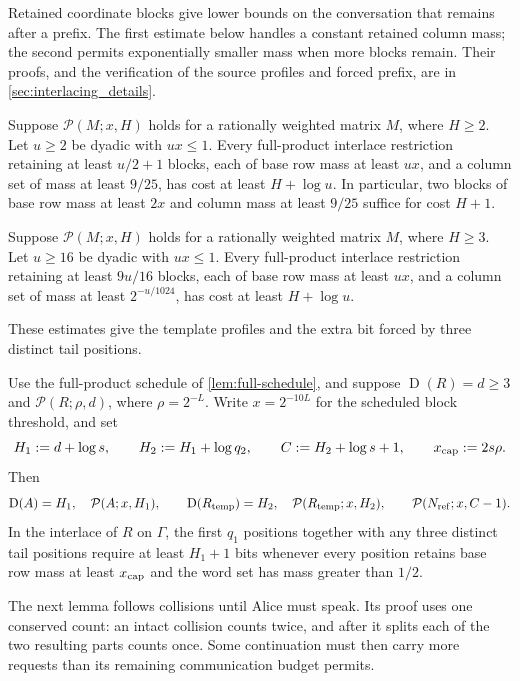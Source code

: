 \documentclass[11pt]{article} \usepackage[utf8]{inputenc}
\theoremstyle{plain} \newtheorem{theorem}{Theorem}[section]
\theoremstyle{definition} \newaliascnt{definition}{theorem}
\newcommand{\D}{\operatorname{D}}
\newcommand{\RP}[3]{\mathcal{P}(#1;#2,#3)}
\begin{document}
Retained coordinate blocks give lower bounds on the conversation that remains
after a prefix. The first estimate below handles a constant retained column
mass; the second permits exponentially smaller mass when more blocks remain.
Their proofs, and the verification of the source profiles and forced prefix, are
in \cref{sec:interlacing_details}.

\begin{lemma}\label{lem:product-blocks}
Suppose $\RP{M}{x}{H}$ holds for a rationally weighted matrix $M$, where
$H\ge2$. Let $u\ge2$ be dyadic with $ux\le1$. Every full-product interlace
restriction retaining at least $u/2+1$ blocks, each of base row mass at least
$ux$, and a column set of mass at least $9/25$, has cost at least $H+\log u$. In
particular, two blocks of base row mass at least $2x$ and column mass at least
$9/25$ suffice for cost $H+1$.
\end{lemma}

\begin{lemma}\label{lem:many-product-blocks}
Suppose $\RP{M}{x}{H}$ holds for a rationally weighted matrix $M$, where
$H\ge3$. Let $u\ge16$ be dyadic with $ux\le1$. Every full-product interlace
restriction retaining at least $9u/16$ blocks, each of base row mass at least
$ux$, and a column set of mass at least $2^{-u/1024}$, has cost at least
$H+\log u$.
\end{lemma}

These estimates give the template profiles and the extra bit forced by three
distinct tail positions.

\begin{lemma}\label{src:profiles}
Use the full-product schedule of \cref{lem:full-schedule}, and suppose
$\D(R)=d\ge3$ and $\RP{R}{\rho}{d}$, where $\rho=2^{-L}$. Write $x=2^{-10L}$ for
the scheduled block threshold, and set
\[
H_1:=d+\log s,\qquad H_2:=H_1+\log q_2,\qquad C:=H_2+\log s+1,\qquad x_{\rm
cap}:=2s\rho.
\]
Then
\[
\D(A)=H_1,\quad \RP{A}{x}{H_1},\qquad \D(R_{\rm temp})=H_2,\quad \RP{R_{\rm
temp}}{x}{H_2},\qquad \RP{N_{\rm ref}}{x}{C-1}.
\]
In the interlace of $R$ on $\Gamma$, the first $q_1$ positions together with any
three distinct tail positions require at least $H_1+1$ bits whenever every
position retains base row mass at least $x_{\rm cap}$ and the word set has mass
greater than $1/2$.
\end{lemma}

The next lemma follows collisions until Alice must speak. Its proof uses
one conserved count: an intact collision counts twice, and after it splits
each of the two resulting parts counts once. Some continuation must then
carry more requests than its remaining communication budget permits.
\end{document}
